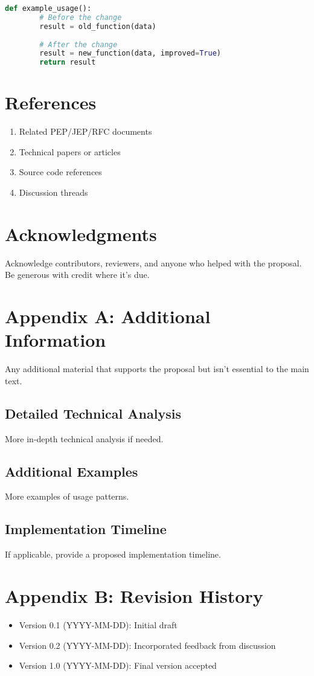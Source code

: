 \documentclass[11pt]{article}
\begin{document}
	\begin{lstlisting}[language=Python,caption=Example usage]
		def example_usage():
		# Before the change
		result = old_function(data)
		
		# After the change
		result = new_function(data, improved=True)
		return result
	\end{lstlisting}
	
	\section{References}
	\begin{enumerate}
		\item Related PEP/JEP/RFC documents
		\item Technical papers or articles
		\item Source code references
		\item Discussion threads
	\end{enumerate}
	
	\section{Acknowledgments}
	Acknowledge contributors, reviewers, and anyone who helped with the proposal. Be generous with credit where it's due.
	
	\appendix
	\section{Appendix A: Additional Information}
	Any additional material that supports the proposal but isn't essential to the main text.
	
	\subsection{Detailed Technical Analysis}
	More in-depth technical analysis if needed.
	
	\subsection{Additional Examples}
	More examples of usage patterns.
	
	\subsection{Implementation Timeline}
	If applicable, provide a proposed implementation timeline.
	
	\section{Appendix B: Revision History}
	\begin{itemize}
		\item Version 0.1 (YYYY-MM-DD): Initial draft
		\item Version 0.2 (YYYY-MM-DD): Incorporated feedback from discussion
		\item Version 1.0 (YYYY-MM-DD): Final version accepted
	\end{itemize}
	
\end{document}
